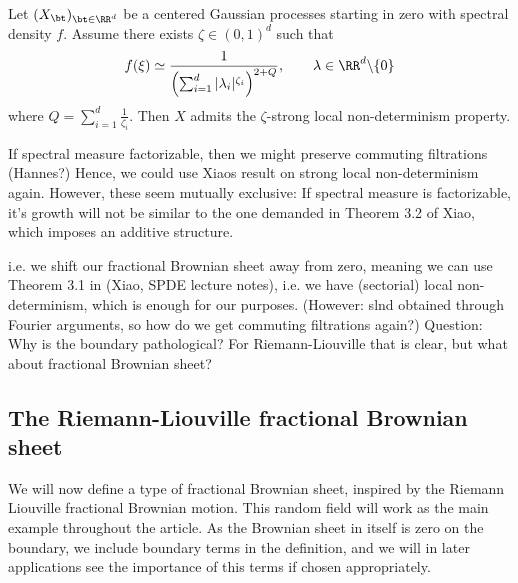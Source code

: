 \begin{thm}\cite[Theorem 3.2]{Xiao}
    Let $(X_\bt)_{\bt\in \RR^d}$ be a centered Gaussian processes starting in zero with spectral density $f$. Assume there exists $\zeta\in (0,1)^d$ such that 
    \[
    f(\xi)\simeq \frac{1}{\left(\sum_{i=1}^d|\lambda_i|^{\zeta_i}\right)^{2+Q}}, \qquad \lambda\in \RR^d\backslash \{0\}
    \]
    where $Q=\sum_{i=1}^d\frac{1}{\zeta_i}$. Then $X$ admits the $\zeta$-strong local non-determinism property.
\end{thm}

\begin{rem}
    If spectral measure factorizable, then we might preserve commuting filtrations (Hannes?) Hence, we could use Xiaos result on strong local non-determinism again. However, these seem mutually exclusive: If spectral measure is factorizable, it's growth will not be similar to the one demanded in Theorem 3.2 of Xiao, which imposes an additive structure. 
\end{rem}




\begin{rem}
i.e. we shift our fractional Brownian sheet away from zero, meaning we can use Theorem 3.1 in (Xiao, SPDE lecture notes), i.e. we have (sectorial) local non-determinism, which is enough for our purposes. (However: slnd obtained through Fourier arguments, so how do we get commuting filtrations again?)  Question: Why is the boundary pathological? For Riemann-Liouville that is clear, but what about fractional Brownian sheet?
\end{rem}



\subsection{The Riemann-Liouville fractional Brownian sheet}

We will now define a type of fractional Brownian sheet, inspired by the Riemann Liouville fractional Brownian motion. This random field will work as the main example throughout the article. As the Brownian sheet in itself is zero on the boundary, we include boundary terms in the definition, and we will in later applications see the importance of this terms if chosen appropriately.

